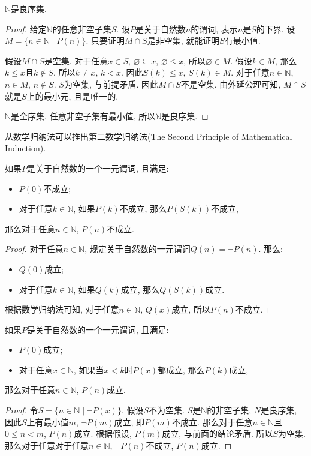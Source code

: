 \begin{theorem}
	$\mathbb N$是良序集.
\end{theorem}

\begin{proof}
	给定$\mathbb N$的任意非空子集$S$. 设$P$是关于自然数$n$的谓词, 表示$n$是$S$的下界. 设$M=\{n\in \mathbb N\mid P(n)\}$. 只要证明$M\cap S$是非空集, 就能证明$S$有最小值.

	假设$M\cap S$是空集. 对于任意$x\in S$, $\varnothing \subseteq x$, $\varnothing \leqslant x$, 所以$\varnothing \in M$. 假设$k\in M$, 那么$k\leqslant x$且$k\notin S$. 所以$k\neq x$, $k<x$. 因此$S(k)\leqslant x$, $S(k)\in M$. 对于任意$n\in \mathbb N$, $n\in M$, $n\notin S$. $S$为空集, 与前提矛盾. 因此$M\cap S$不是空集. 由外延公理可知, $M\cap S$就是$S$上的最小元, 且是唯一的.

	$\mathbb N$是全序集, 任意非空子集有最小值, 所以$\mathbb N$是良序集.
\end{proof}

从数学归纳法可以推出第二数学归纳法(The Second Principle of Mathematical Induction).

\begin{proposition}
	如果$P$是关于自然数的一个一元谓词, 且满足:
	\begin{itemize}
		\item $P(0)$不成立;
		\item 对于任意$k\in \mathbb N$, 如果$P(k)$不成立, 那么$P(S(k))$不成立,
	\end{itemize}
	那么对于任意$n\in \mathbb N$, $P(n)$不成立.
\end{proposition}

\begin{proof}
	对于任意$n\in \mathbb N$, 规定关于自然数的一元谓词$Q(n)=\neg P(n)$. 那么:
	\begin{itemize}
		\item $Q(0)$成立;
		\item 对于任意$k\in \mathbb N$, 如果$Q(k)$成立, 那么$Q(S(k))$成立.
	\end{itemize}
	根据数学归纳法可知, 对于任意$n\in \mathbb N$, $Q(x)$成立, 所以$P(n)$不成立.
\end{proof}

\begin{theorem}[第二数学归纳法]
	如果$P$是关于自然数的一个一元谓词, 且满足:
	\begin{itemize}
		\item $P(0)$成立;
		\item 对于任意$x\in \mathbb N$, 如果当$x<k$时$P(x)$都成立, 那么$P(k)$成立,
	\end{itemize}
	那么对于任意$n\in \mathbb N$, $P(n)$成立.
\end{theorem}

\begin{proof}
	令$S=\{n\in \mathbb N\mid \neg P(x)\}$. 假设$S$不为空集. $S$是$\mathbb N$的非空子集, $N$是良序集, 因此$S$上有最小值$m$, $\neg P(m)$成立, 即$P(m)$不成立. 那么对于任意$n\in \mathbb N$且$0\leqslant n<m$, $P(n)$成立. 根据假设, $P(m)$成立, 与前面的结论矛盾. 所以$S$为空集. 那么对于任意对于任意$n\in \mathbb N$,  $\neg P(n)$不成立, $P(n)$成立.
\end{proof}
